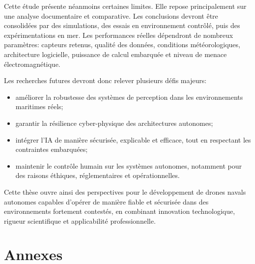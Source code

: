 \documentclass[12pt, a4paper, twoside, openright]{report}
\begin{document}
Cette étude présente néanmoins certaines limites. Elle repose principalement sur une analyse documentaire et comparative. Les conclusions devront être consolidées par des simulations, des essais en environnement contrôlé, puis des expérimentations en mer. Les performances réelles dépendront de nombreux paramètres: capteurs retenus, qualité des données, conditions météorologiques, architecture logicielle, puissance de calcul embarquée et niveau de menace électromagnétique.

Les recherches futures devront donc relever plusieurs défis majeurs:
\begin{itemize}
    \item améliorer la robustesse des systèmes de perception dans les environnements maritimes réels;
    \item garantir la résilience cyber-physique des architectures autonomes;
    \item intégrer l’IA de manière sécurisée, explicable et efficace, tout en respectant les contraintes embarquées;
    \item maintenir le contrôle humain sur les systèmes autonomes, notamment pour des raisons éthiques, réglementaires et opérationnelles.
\end{itemize}

Cette thèse ouvre ainsi des perspectives pour le développement de drones navals autonomes capables d’opérer de manière fiable et sécurisée dans des environnements fortement contestés, en combinant innovation technologique, rigueur scientifique et applicabilité professionnelle.

\cleardoublepage

\printbibliography[title=Bibliographie]

\appendix
\chapter{Annexes}
\end{document}

